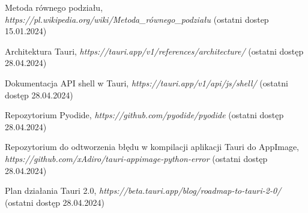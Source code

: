 \documentclass{SGGW-thesis}
\begin{document}
\begin{thebibliography}{9}
	Metoda równego podziału, 
	\textit{https://pl.wikipedia.org/wiki/Metoda\_równego\_podziału}
	(ostatni dostep 15.01.2024)
	
	Architektura Tauri, 
	\textit{https://tauri.app/v1/references/architecture/}
	(ostatni dostęp 28.04.2024)
	
	Dokumentacja API shell w Tauri, 
	\textit{https://tauri.app/v1/api/js/shell/}
	(ostatni dostęp 28.04.2024)
	

	
	Repozytorium Pyodide, 
	\textit{https://github.com/pyodide/pyodide}
	(ostatni dostęp 28.04.2024)
	
	Repozytorium do odtworzenia błędu w kompilacji aplikacji Tauri do AppImage, 
	\textit{https://github.com/xAdiro/tauri-appimage-python-error}
	(ostatni dostęp 28.04.2024)
	
	Plan działania Tauri 2.0, 
	\textit{https://beta.tauri.app/blog/roadmap-to-tauri-2-0/}
	(ostatni dostęp 28.04.2024)
	
	
	
	
	
	
	
	
	
\end{thebibliography}

\beforelastpage
\end{document}

